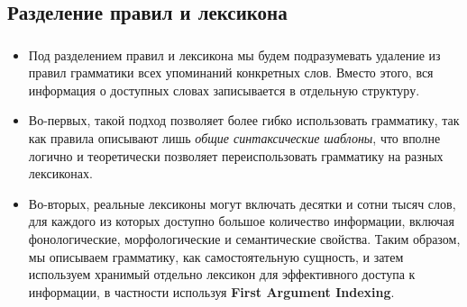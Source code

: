 

\subsection{Разделение правил и лексикона}


\begin{frame}

	\frametitle{\insertsection}
	\framesubtitle{\insertsubsection}
	
	\begin{itemize}
		\item Под разделением правил и лексикона мы будем подразумевать удаление из правил грамматики всех упоминаний конкретных слов. Вместо этого, вся информация о доступных словах записывается в отдельную структуру.
		\item Во-первых, такой подход позволяет более гибко использовать грамматику, так как правила описывают лишь \textit{общие синтаксические шаблоны}, что вполне логично и теоретически позволяет переиспользовать грамматику на разных лексиконах.
		\item Во-вторых, реальные лексиконы могут включать десятки и сотни тысяч слов, для каждого из которых доступно большое количество информации, включая фонологические, морфологические и семантические свойства. Таким образом, мы описываем грамматику, как самостоятельную сущность, и затем используем хранимый отдельно лексикон для эффективного доступа к информации, в частности используя \textbf{First Argument Indexing}.
	\end{itemize}	

\end{frame}	


